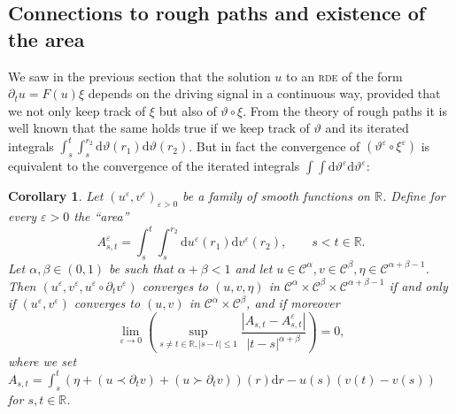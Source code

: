 \documentclass[11pt,a4paper]{article}
\newcommand{\mathd}{\mathrm{d}}
\newtheorem{corollary}[theorem]{Corollary}
\theoremstyle{remark}
\newcommand{\CC}{\ensuremath{\mathscr{C}}}
\begin{document}
\subsection{Connections to rough paths and existence of the area}

We saw in the previous section that the solution $u$ to an \textsc{rde} of the form
$\partial_{t} u=F ( u ) \xi$ depends on the driving signal in a continuous way, provided
that we not only keep track of $\xi$ but also of $\vartheta \circ \xi$. From
the theory of rough paths it is well known that the same holds true if we keep
track of $\vartheta$ and its iterated integrals $\int_{s}^{t} \int_{s}^{r_{2}} \mathd \vartheta ( r_{1} ) \mathd \vartheta ( r_{2} )$. But in fact the convergence of $( \vartheta^{\varepsilon} \circ \xi^{\varepsilon} )$
is equivalent to the convergence of the iterated integrals $\int \int \mathd \vartheta^{\varepsilon} \mathd \vartheta^{\varepsilon}$:

\begin{corollary}\label{corollary:classical rough path}
  Let $( u^{\varepsilon} ,v^{\varepsilon} )_{\varepsilon >0}$ be a family of smooth functions on
  $\mathbb{R}$. Define for every $\varepsilon >0$ the ``area''
  \[
     A^{\varepsilon}_{s,t} = \int_{s}^{t} \int_{s}^{r_{2}} \mathd u^{\varepsilon} ( r_{1} ) \mathd v^{\varepsilon} ( r_{2} ) , \hspace{2em} s<t \in \mathbb{R}.
  \]
  Let $\alpha , \beta \in ( 0,1 )$ be such that $\alpha + \beta <1$ and let $u \in \CC^\alpha ,v \in \CC^\beta , \eta \in \CC^{\alpha + \beta -1}$. Then $( u^{\varepsilon} ,v^{\varepsilon} ,u^{\varepsilon} \circ \partial_{t} v^{\varepsilon} )$ converges to $( u,v, \eta )$ in $\CC^{\alpha} \times \CC^\beta \times \CC^{\alpha + \beta -1}$ if and only if $( u^{\varepsilon},v^{\varepsilon} )$ converges to $( u,v )$ in $\CC^{\alpha} \times \CC^\beta$, and if moreover
  \begin{equation}\label{eq:classical rough path}
     \lim_{\varepsilon \rightarrow 0} \left( \sup_{s \neq t \in \mathbb{R}, | s-t | \leqslant 1} \frac{| A_{s,t} -A^{\varepsilon}_{s,t} |}{| t-s |^{\alpha + \beta}} \right) =0,
  \end{equation}
  where we set $A_{s,t} = \int_{s}^{t} ( \eta + ( u  \prec \partial_{t} v ) + ( u \succ \partial_{t} v ) ) ( r ) \mathd r-u ( s ) ( v ( t ) -v ( s ) ) $ for $s,t \in \mathbb{R}$.
\end{corollary}
\end{document}
